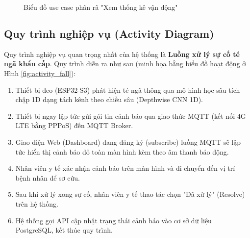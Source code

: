 \documentclass[../DoAn.tex]{subfiles}
\begin{document}
\begin{figure}[H]
    \centering
    \caption{Biểu đồ use case phân rã "Xem thống kê vận động"}
    \label{fig:use_case_thong_ke}
\end{figure}

\subsection{Quy trình nghiệp vụ (Activity Diagram)}
\label{subsection:2.2.6}
Quy trình nghiệp vụ quan trọng nhất của hệ thống là \textbf{Luồng xử lý sự cố té ngã khẩn cấp}. Quy trình diễn ra như sau (minh họa bằng biểu đồ hoạt động ở Hình \ref{fig:activity_fall}):
\begin{enumerate}
    \item Thiết bị đeo (ESP32-S3) phát hiện té ngã thông qua mô hình học sâu tích chập 1D dạng tách kênh theo chiều sâu (Depthwise CNN 1D).
    \item Thiết bị ngay lập tức gửi gói tin cảnh báo qua giao thức MQTT (kết nối 4G LTE bằng PPPoS) đến MQTT Broker.
    \item Giao diện Web (Dashboard) đang đăng ký (subscribe) luồng MQTT sẽ lập tức hiển thị cảnh báo đỏ toàn màn hình kèm theo âm thanh báo động.
    \item Nhân viên y tế xác nhận cảnh báo trên màn hình và di chuyển đến vị trí bệnh nhân để sơ cứu.
    \item Sau khi xử lý xong sự cố, nhân viên y tế thao tác chọn "Đã xử lý" (Resolve) trên hệ thống.
    \item Hệ thống gọi API cập nhật trạng thái cảnh báo vào cơ sở dữ liệu PostgreSQL, kết thúc quy trình.
\end{enumerate}
\end{document}
